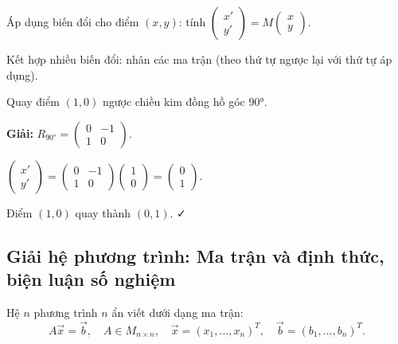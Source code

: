 \documentclass[12pt,a4paper]{article}
\begin{document}
\begin{luuy}
  Áp dụng biến đổi cho điểm $(x, y)$: tính $\begin{pmatrix}x' \\ y'\end{pmatrix} = M \begin{pmatrix}x \\ y\end{pmatrix}$.

  Kết hợp nhiều biến đổi: nhân các ma trận (theo thứ tự ngược lại với thứ tự áp dụng).
\end{luuy}

\begin{vidu}
  Quay điểm $(1, 0)$ ngược chiều kim đồng hồ góc $90°$.

  \medskip\textbf{Giải:}
  $R_{90°} = \begin{pmatrix}0 & -1 \\ 1 & 0\end{pmatrix}$.

  $\begin{pmatrix}x' \\ y'\end{pmatrix} = \begin{pmatrix}0 & -1 \\ 1 & 0\end{pmatrix}\begin{pmatrix}1 \\ 0\end{pmatrix} = \begin{pmatrix}0 \\ 1\end{pmatrix}$.

  Điểm $(1,0)$ quay thành $(0,1)$. ✓
\end{vidu}

\subsection{Giải hệ phương trình: Ma trận và định thức, biện luận số nghiệm}

\begin{dinhnghia}[title={Hệ phương trình tuyến tính dạng ma trận}]
  Hệ $n$ phương trình $n$ ẩn viết dưới dạng ma trận:
  \[
    A\vec{x} = \vec{b}, \quad A \in M_{n\times n},\quad \vec{x} = (x_1, \ldots, x_n)^T,\quad \vec{b} = (b_1, \ldots, b_n)^T.
  \]
\end{dinhnghia}
\end{document}
